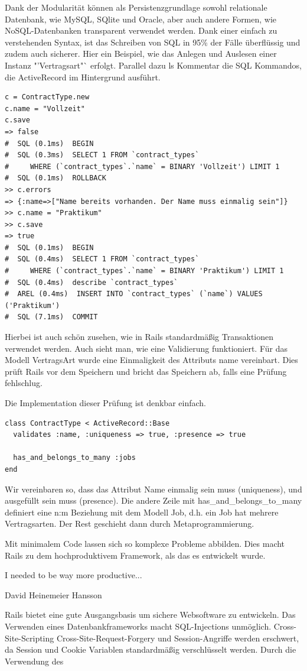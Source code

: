 Dank der Modularität können als Persistenzgrundlage sowohl relationale Datenbank, wie MySQL, SQlite und Oracle, aber auch andere Formen, wie NoSQL-Datenbanken transparent verwendet werden. Dank einer einfach zu verstehenden Syntax, ist das Schreiben von SQL in 95\% der Fälle überflüssig und zudem auch sicherer. Hier ein Beispiel, wie das Anlegen und Auslesen einer Instanz "'Vertragsart"` erfolgt. Parallel dazu ls Kommentar die SQL Kommandos, die ActiveRecord im Hintergrund ausführt.
\begin{lstlisting}
c = ContractType.new
c.name = "Vollzeit"
c.save
=> false
#  SQL (0.1ms)  BEGIN
#  SQL (0.3ms)  SELECT 1 FROM `contract_types` 
#     WHERE (`contract_types`.`name` = BINARY 'Vollzeit') LIMIT 1
#  SQL (0.1ms)  ROLLBACK
>> c.errors
=> {:name=>["Name bereits vorhanden. Der Name muss einmalig sein"]}
>> c.name = "Praktikum"
>> c.save
=> true
#  SQL (0.1ms)  BEGIN
#  SQL (0.4ms)  SELECT 1 FROM `contract_types` 
#     WHERE (`contract_types`.`name` = BINARY 'Praktikum') LIMIT 1
#  SQL (0.4ms)  describe `contract_types`
#  AREL (0.4ms)  INSERT INTO `contract_types` (`name`) VALUES ('Praktikum')
#  SQL (7.1ms)  COMMIT
\end{lstlisting}
Hierbei ist auch schön zusehen, wie in Rails standardmäßig Transaktionen verwendet werden. Auch sieht man, wie eine Validierung funktioniert. Für das Modell VertragsArt wurde eine Einmaligkeit des Attributs name vereinbart. Dies prüft Rails vor dem Speichern und bricht das Speichern ab, falls eine Prüfung fehlschlug.

Die Implementation dieser Prüfung ist denkbar einfach.
\begin{lstlisting}
class ContractType < ActiveRecord::Base
  validates :name, :uniqueness => true, :presence => true
  
  has_and_belongs_to_many :jobs
end
\end{lstlisting}
Wir vereinbaren so, dass das Attribut Name einmalig sein muss (uniqueness), und ausgefüllt sein muss (presence). Die andere Zeile mit has\_and\_belongs\_to\_many definiert eine n:m Beziehung mit dem Modell Job, d.h. ein Job hat mehrere Vertragsarten. Der Rest geschieht dann durch Metaprogrammierung.

Mit minimalem Code lassen sich so komplexe Probleme abbilden. Dies macht Rails zu dem hochproduktivem Framework, als das es entwickelt wurde.
\epigraph{I needed to be way more productive...}{David Heinemeier Hansson}

Rails bietet eine gute Ausgangsbasis um sichere Websoftware zu entwickeln. Das Verwenden eines Datenbankframeworks macht SQL-Injections unmöglich. 
Cross-Site-Scripting
Cross-Site-Request-Forgery und Session-Angriffe werden erschwert, da Session und Cookie Variablen standardmäßig verschlüsselt werden.
Durch die Verwendung des

